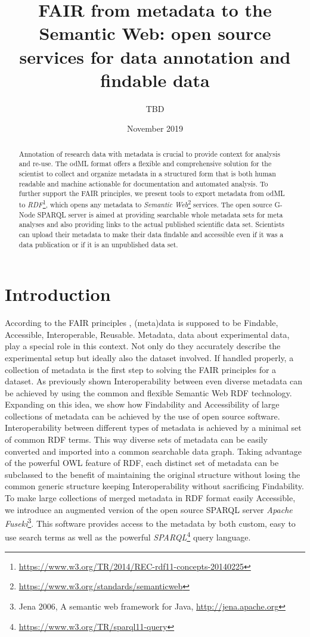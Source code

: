 \documentclass{article}
\title{FAIR from metadata to the Semantic Web: open source services for data annotation and findable data}
\author{TBD}
\date{November 2019}
\begin{document}
\maketitle

\begin{abstract}
Annotation of research data with metadata is crucial to provide context for analysis and  re-use. The odML format offers a flexible and comprehensive solution for the scientist to collect and organize metadata in a structured form that is both human readable and machine actionable for documentation and automated analysis. To further support the FAIR principles, we present tools to export metadata from odML to \textit{RDF}\footnote{\url{https://www.w3.org/TR/2014/REC-rdf11-concepts-20140225}}, which opens any metadata to \textit{Semantic Web}\footnote{\url{https://www.w3.org/standards/semanticweb}} services. The open source G-Node SPARQL server is aimed at providing searchable whole metadata sets for meta analyses and also providing links to the actual published scientific data set. Scientists can upload their metadata to make their data findable and accessible even if it was a data publication or if it is an unpublished data set.
\end{abstract}

\section{Introduction}
According to the FAIR principles \cite{Wilkinson_2016}, (meta)data is supposed to be Findable, Accessible, Interoperable, Reusable. Metadata, data about experimental data, play a special role in this context. Not only do they accurately describe the experimental setup but ideally also the dataset involved. If handled properly, a collection of metadata is the first step to solving the FAIR principles for a dataset. As previously shown \cite{Teeters_2017} Interoperability  between even diverse metadata can be achieved by using the common and flexible Semantic Web RDF technology.
Expanding on this idea, we show how Findability and Accessibility of large collections of metadata can be achieved by the use of open source software. Interoperability between different types of metadata is achieved by a minimal set of common RDF terms. This way diverse sets of metadata can be easily converted and imported into a common searchable data graph. Taking advantage of the powerful OWL feature of RDF, each distinct set of metadata can be subclassed to the benefit of maintaining the original structure without losing the common generic structure keeping Interoperability without sacrificing Findability.
To make large collections of merged metadata in RDF format easily Accessible, we introduce an augmented version of the open source SPARQL server \textit{Apache Fuseki}\footnote{Jena 2006, A semantic web framework for Java, \url{http://jena.apache.org}}. This software provides access to the metadata by both custom, easy to use search terms as well as the powerful \textit{SPARQL}\footnote{\url{https://www.w3.org/TR/sparql11-query}} query language.
\end{document}
